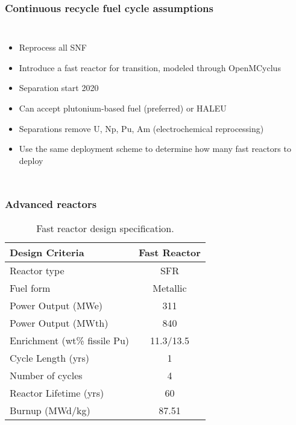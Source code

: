 \begin{frame}
    \frametitle{Continuous recycle fuel cycle assumptions}
    \begin{columns}
        
    \column[t]{6cm}
    \vspace{-0.5cm}
    

        \column[t]{4.5cm}
        \begin{itemize}
            \item Reprocess all \gls{SNF} 
            \item Introduce a fast reactor for transition, modeled through 
                  OpenMCyclus
            \item Separation start 2020
            \item Can accept plutonium-based fuel (preferred) or \gls{HALEU}
            \item Separations remove U, Np, Pu, Am (electrochemical reprocessing)
            \item<2-> Use the same deployment scheme to determine how many fast 
                  reactors to deploy
        \end{itemize}

\end{columns}
\end{frame}

\begin{frame}
    \frametitle{Advanced reactors}
    \vspace{-0.7cm}
    \begingroup
        \renewcommand{\arraystretch}{1.2}
        \begin{table}
            \centering
            \begin{threeparttable}
        
            \caption{Fast reactor design specification.}
            \label{tab:fast_rx}
            \begin{tabular}{l c}
                \hline
                Design Criteria & Fast Reactor \cite{fichtlscherer_assessing_2019,triplett_prism:_2012}\\
                \hline
                Reactor type & \acrfull{SFR} \\
                Fuel form &  Metallic \\
                Power Output (MWe) & 311 \\
                Power Output (MWth) & 840 \\
                Enrichment (wt\% fissile Pu) &  11.3/13.5\\
                Cycle Length (yrs) & 1 \\
                Number of cycles &  4 \\
                Reactor Lifetime (yrs)&  60\\
                Burnup (MWd/kg) & 87.51 \\
                \hline
            \end{tabular}
        \end{threeparttable}
        \end{table} 
    \endgroup
\end{frame}

